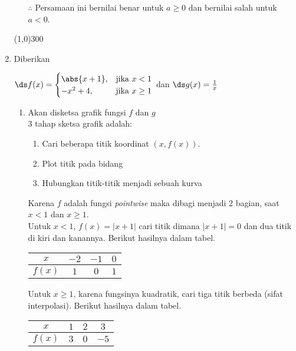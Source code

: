 \begin{enumerate}[leftmargin=*, label={\arabic*}.]
\begin{enumerate}[label={\alph*}.]
$\therefore$ Persamaan ini bernilai benar untuk $a \geq 0$ dan bernilai salah untuk $a < 0$.
\end{enumerate}
\begin{center}
    \line(1,0){300}
\end{center}
\item Diberikan
\begin{center}
    $\ds f(x) = 
    \begin{cases}
        \abs{x+1}, &\text{jika $x < 1$}\\
        -x^{2}+4, &\text{jika $x \geq 1$}
    \end{cases}$ dan $\ds g(x) = \frac{1}{x}$
\end{center}
\begin{enumerate}[label={\alph*}.]
    \item Akan disketsa grafik fungsi $f$ dan $g$\\
    3 tahap sketsa grafik adalah:
    \begin{enumerate}[label={\arabic*})]
        \item Cari beberapa titik koordinat $(x,f(x))$.
        \item Plot titik pada bidang
        \item Hubungkan titik-titik menjadi sebuah kurva
    \end{enumerate}
    Karena $f$ adalah fungsi \textit{pointwise} maka dibagi menjadi 2 bagian, saat
    $x < 1$ dan $x \geq 1$.\\
    Untuk $x < 1$, $f(x) = |x+1|$ cari titik dimana $|x+1|=0$ dan dua titik di kiri 
    dan kanannya. Berikut hasilnya dalam tabel.
    \begin{center}
    \begin{tabular}{|c|c|c|c|}\hline
        $x$ & $-2$ & $-1$ & $0$ \\ \hline
        $f(x)$ & $1$ & $0$ & $1$ \\ \hline
    \end{tabular}
    \end{center}
    Untuk $x \geq 1$, karena fungsinya kuadratik, cari tiga titik berbeda (sifat interpolasi).
    Berikut hasilnya dalam tabel.
    \begin{center}
    \begin{tabular}{|c|c|c|c|}\hline
        $x$ & $1$ & $2$ & $3$ \\ \hline
        $f(x)$ & $3$ & $0$ & $-5$ \\ \hline
    \end{tabular}
    \end{center}


\end{enumerate}
\end{enumerate}
